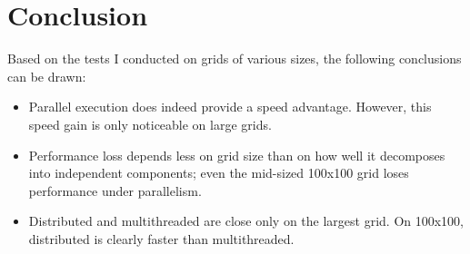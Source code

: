 \documentclass[sigconf,nonacm]{acmart}
\begin{document}
\section{Conclusion}
Based on the tests I conducted on grids of various sizes, the following conclusions can be drawn:
\begin{itemize}
  \item Parallel execution does indeed provide a speed advantage. However, this speed gain is only noticeable on large grids.
  \item Performance loss depends less on grid size than on how well it decomposes into independent components; even the mid-sized 100x100 grid loses performance under parallelism.
  \item Distributed and multithreaded are close only on the largest grid. On 100x100, distributed is clearly faster than multithreaded.
\end{itemize}
\end{document}
